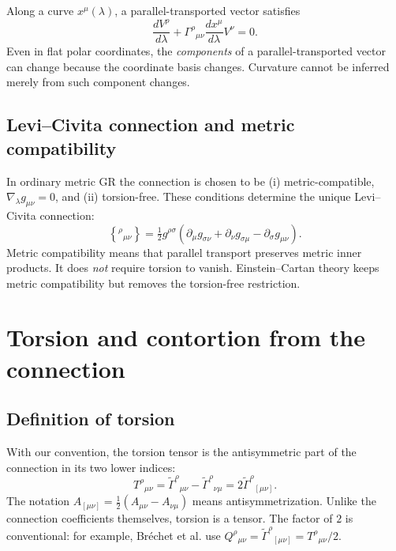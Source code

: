 \documentclass[11pt,a4paper]{article}
\begin{document}
Along a curve $x^\mu(\lambda)$, a parallel-transported vector satisfies
\begin{equation}
\frac{dV^\rho}{d\lambda}+\Gamma^\rho{}_{\mu\nu}\frac{dx^\mu}{d\lambda}V^\nu=0.
\end{equation}
Even in flat polar coordinates, the \emph{components} of a parallel-transported vector can change because the coordinate basis changes. Curvature cannot be inferred merely from such component changes.

\subsection{Levi--Civita connection and metric compatibility}
In ordinary metric GR the connection is chosen to be (i) metric-compatible, $\nabla_\lambda g_{\mu\nu}=0$, and (ii) torsion-free. These conditions determine the unique Levi--Civita connection:
\begin{equation}\label{eq:LC}
\boxed{\left\{^\rho{}_{\mu\nu}\right\}=\tfrac12g^{\rho\sigma}(\partial_\mu g_{\sigma\nu}+\partial_\nu g_{\sigma\mu}-\partial_\sigma g_{\mu\nu}).}
\end{equation}
Metric compatibility means that parallel transport preserves metric inner products. It does \emph{not} require torsion to vanish. Einstein--Cartan theory keeps metric compatibility but removes the torsion-free restriction.

\section{Torsion and contortion from the connection}
\subsection{Definition of torsion}
With our convention, the torsion tensor is the antisymmetric part of the connection in its two lower indices:
\begin{equation}\label{eq:torsion}
\boxed{T^\rho{}_{\mu\nu}=\widetilde\Gamma^\rho{}_{\mu\nu}-\widetilde\Gamma^\rho{}_{\nu\mu}=2\widetilde\Gamma^\rho{}_{[\mu\nu]}.}
\end{equation}
The notation $A_{[\mu\nu]}=\tfrac12(A_{\mu\nu}-A_{\nu\mu})$ means antisymmetrization. Unlike the connection coefficients themselves, torsion is a tensor. The factor of $2$ is conventional: for example, Br\'echet et al. use $Q^\rho{}_{\mu\nu}=\widetilde\Gamma^\rho{}_{[\mu\nu]}=T^\rho{}_{\mu\nu}/2$.
\end{document}
